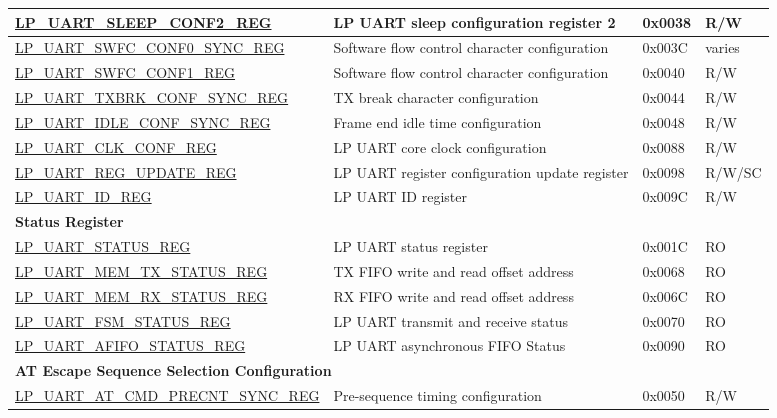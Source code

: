 \begin{longtable}{ | p{6.6cm} | p{6.5cm} | p{1.3cm} | p{1.6cm} | }
\hyperref[regdesc:LPUARTSLEEPCONF2REG]{LP\_UART\_SLEEP\_CONF2\_REG} & LP UART sleep configuration register 2 & 0x0038 & R/W \\ \hline
\hyperref[regdesc:LPUARTSWFCCONF0SYNCREG]{LP\_UART\_SWFC\_CONF0\_SYNC\_REG} & Software flow control character configuration & 0x003C & varies \\ \hline
\hyperref[regdesc:LPUARTSWFCCONF1REG]{LP\_UART\_SWFC\_CONF1\_REG} & Software flow control character configuration & 0x0040 & R/W \\ \hline
\hyperref[regdesc:LPUARTTXBRKCONFSYNCREG]{LP\_UART\_TXBRK\_CONF\_SYNC\_REG} & TX break character configuration & 0x0044 & R/W \\ \hline
\hyperref[regdesc:LPUARTIDLECONFSYNCREG]{LP\_UART\_IDLE\_CONF\_SYNC\_REG} & Frame end idle time configuration & 0x0048 & R/W \\ \hline
\hyperref[regdesc:LPUARTCLKCONFREG]{LP\_UART\_CLK\_CONF\_REG} & LP UART core clock configuration & 0x0088 & R/W \\ \hline
\hyperref[regdesc:LPUARTREGUPDATEREG]{LP\_UART\_REG\_UPDATE\_REG} & LP UART register configuration update register & 0x0098 & R/W/SC \\ \hline
\hyperref[regdesc:LPUARTIDREG]{LP\_UART\_ID\_REG} & LP UART ID register & 0x009C & R/W \\ \hline
\multicolumn{4}{|l|}{\textbf{Status Register}} \\ \hline
\hyperref[regdesc:LPUARTSTATUSREG]{LP\_UART\_STATUS\_REG} & LP UART status register & 0x001C & RO \\ \hline
\hyperref[regdesc:LPUARTMEMTXSTATUSREG]{LP\_UART\_MEM\_TX\_STATUS\_REG} & TX FIFO write and read offset address & 0x0068 & RO \\ \hline
\hyperref[regdesc:LPUARTMEMRXSTATUSREG]{LP\_UART\_MEM\_RX\_STATUS\_REG} & RX FIFO write and read offset address & 0x006C & RO \\ \hline
\hyperref[regdesc:LPUARTFSMSTATUSREG]{LP\_UART\_FSM\_STATUS\_REG} & LP UART transmit and receive status & 0x0070 & RO \\ \hline
\hyperref[regdesc:LPUARTAFIFOSTATUSREG]{LP\_UART\_AFIFO\_STATUS\_REG} & LP UART asynchronous FIFO Status & 0x0090 & RO \\ \hline
\multicolumn{4}{|l|}{\textbf{AT Escape Sequence Selection Configuration}} \\ \hline
\hyperref[regdesc:LPUARTATCMDPRECNTSYNCREG]{LP\_UART\_AT\_CMD\_PRECNT\_SYNC\_REG} & Pre-sequence timing configuration & 0x0050 & R/W \\ \hline

\end{longtable}
